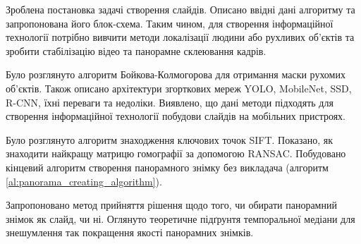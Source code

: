\chapterConclusion

Зроблена постановка задачі створення слайдів. Описано ввідні
дані алгоритму та запропонована його блок-схема.
Таким чином, для створення інформаційної технології
потрібно вивчити методи локалізації людини або рухливих об'єктів та
зробити стабілізацію відео та панорамне склеювання кадрів.


Було розглянуто алгоритм Бойкова-Колмогорова для
отримання маски рухомих об'єктів. Також описано архітектури
згорткових мереж YOLO, MobileNet, SSD, R-CNN, їхні переваги та недоліки.
Виявлено, що дані методи підходять для
створення інформаційної технології побудови слайдів на
мобільних пристроях.


Було розглянуто алгоритм знаходження ключових точок SIFT.
Показано, як знаходити найкращу матрицю гомографії за 
допомогою RANSAC. Побудовано кінцевий алгоритм створення
панорамного знімку без викладача (алгоритм \ref{al:panorama_creating_algorithm}).


Запропоновано метод прийняття рішення щодо того, чи обирати панорамний знімок як слайд, чи ні.
Оглянуто теоретичне підґрунтя темпоральної медіани для 
знешумлення так покращення якості панорамних знімків.